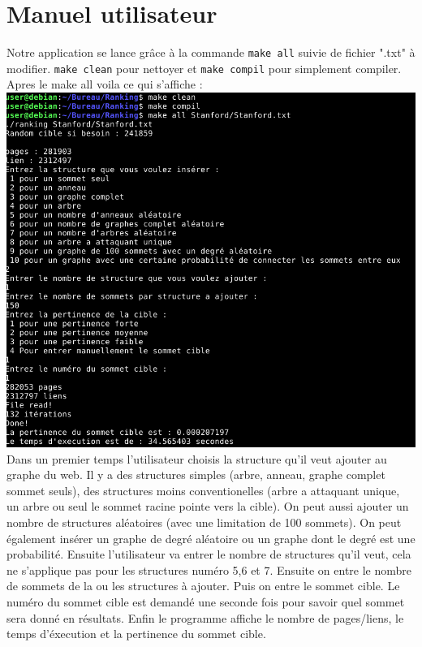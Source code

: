 \documentclass[a4paper,11pt]{article}
\begin{document}
\section{Manuel utilisateur}
	Notre application se lance grâce à la commande \texttt{make all} suivie de fichier ".txt" à modifier.
	\texttt{make clean} pour nettoyer et \texttt{make compil} pour simplement compiler.\\
	Apres le make all voila ce qui s'affiche : \\
	\includegraphics[scale = 0.5]{Captures/manuel.png}\\
	Dans un premier temps l'utilisateur choisis la structure qu'il veut ajouter au graphe du web.
	Il y a des structures simples (arbre, anneau, graphe complet sommet seuls), des structures moins conventionelles (arbre a attaquant unique, un arbre ou seul le sommet racine pointe vers la cible).
	On peut aussi ajouter un nombre de structures aléatoires (avec une limitation de 100 sommets). On peut également insérer un graphe de degré aléatoire ou un graphe dont le degré est une probabilité.
	Ensuite l'utilisateur va entrer le nombre de structures qu'il veut, cela ne s'applique pas pour les structures numéro 5,6 et 7. 
	Ensuite on entre le nombre de sommets de la ou les structures à ajouter. 
	Puis on entre le sommet cible. Le numéro du sommet cible est demandé une seconde fois pour savoir quel sommet sera donné en résultats.
	Enfin le programme affiche le nombre de pages/liens, le temps d'éxecution et la pertinence du sommet cible.\\
	
\end{document}
